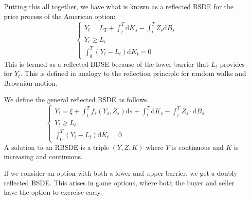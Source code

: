 \documentclass{amsart}
\theoremstyle{definition}
\theoremstyle{remark}
\numberwithin{equation}{section}
\begin{document}
Putting this all together, we have what is known as a reflected BSDE for the price process of the American option:
\begin{equation}
    \begin{cases}
        Y_t = L_T + \int_t^T \mathrm{d} K_s - \int_t^T Z_s \mathrm{d} B_s \\
        Y_t \ge L_t \\
        \int_0^T (Y_t - L_t) \mathrm{d} K_t = 0
    \end{cases}
\end{equation}
This is termed as a reflected BDSE because of the lower barrier that $L_t$ provides for $Y_t$. This is defined in analogy to the reflection principle for random walks and Brownian motion.

We define the general reflected BSDE as follows. 
\begin{equation}
    \begin{cases}
        Y_t = \xi + \int_t^T f_s(Y_s, Z_s) \mathrm{d} s + \int_t^T \mathrm{d} K_s - \int_t^T Z_s \cdot \mathrm{d} B_s \\
        Y_t \ge L_t \\
        \int_0^T (Y_t - L_t) \mathrm{d} K_t = 0
    \end{cases}
\end{equation}
A solution to an RBSDE is a triple $(Y, Z, K)$ where $Y$ is continuous and $K$ is increasing and continuous. 

If we consider an option with both a lower and upper barrier, we get a doubly reflected BSDE. This arises in game options, where both the buyer and seller have the option to exercise early.


\end{document}

